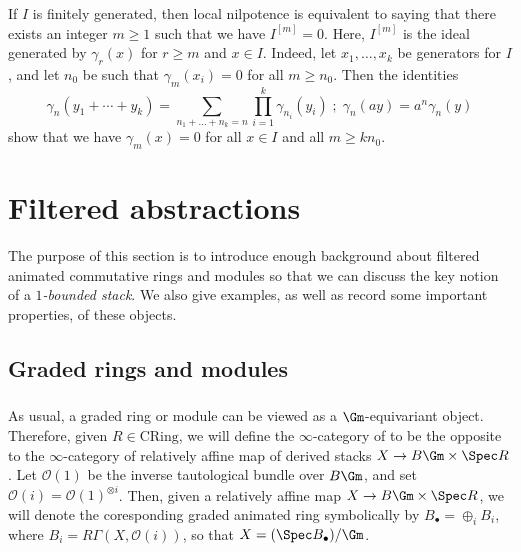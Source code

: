 \documentclass[10pt]{amsart}
\begin{document}
\begin{remark}
\label{rem:nilpotent_finitely_generated_divided_powers}
If $I$ is finitely generated, then local nilpotence is equivalent to saying that there exists an integer $m\ge 1$ such that we have $I^{[m]} = 0$. Here, $I^{[m]}$ is the ideal generated by $\gamma_r(x)$ for $r\ge m$ and $x\in I$. Indeed, let $x_1,\ldots,x_k$ be generators for $I$, and let $n_0$ be such that $\gamma_m(x_i) = 0$ for all $m\ge n_0$. Then the identities
\[
\gamma_n(y_1+\cdots+y_k) = \sum_{n_1+\ldots+n_k = n}\prod_{i=1}^k\gamma_{n_i}(y_i)\;;\; \gamma_n(ay) = a^n\gamma_n(y)
\]  
show that we have $\gamma_m(x) = 0$ for all $x\in I$ and all $m\ge kn_0$.
\end{remark}  


\section{Filtered abstractions}
\label{sec:filtered_rings_stacks}

The purpose of this section is to introduce enough background about filtered animated commutative rings and modules so that we can discuss the key notion of a \emph{$1$-bounded stack}. We also give examples, as well as record some important properties, of these objects.

\subsection{Graded rings and modules}
\label{subsec:graded}

\subsubsection{}
As usual, a graded ring or module can be viewed as a $\Gm$-equivariant object. Therefore, given $R\in \mathrm{CRing}$, we will define the $\infty$-category of   to be the opposite to the $\infty$-category of relatively affine map of derived stacks $X\to B\Gm\times \Spec R$. Let $\mathcal{O}(1)$ be the inverse tautological bundle over $B\Gm$, and set $\mathcal{O}(i) = \mathcal{O}(1)^{\otimes i}$. Then, given a relatively affine map $X\to B\Gm\times \Spec R$, we will denote the coresponding graded animated ring symbolically by $B_\bullet = \oplus_i B_i$, where $B_i = R\Gamma(X,\mathcal{O}(i))$, so that $X = (\Spec B_\bullet)/\Gm$.
\end{document}
